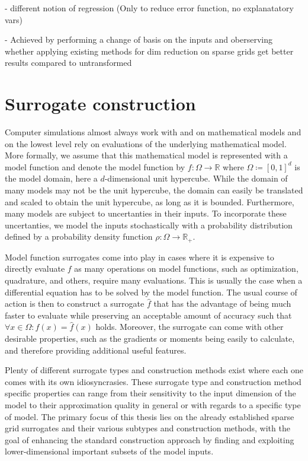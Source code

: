 \documentclass[
  a4paper,  %
  twoside,  %
  bibliography=totoc,
  headsepline,
  cleardoublepage=empty,
  parskip=half,
  draft=false
]{scrbook}
\begin{document}
- different notion of regression (Only to reduce error function, no explanatatory vars)

- Achieved by performing a change of basis on the inputs and oberserving whether applying existing methods for dim reduction on sparse grids get better results compared to untransformed

\chapter{Surrogate construction}
\label{chap:c2}

Computer simulations almost always work with and on mathematical models and on the lowest level rely on evaluations of the underlying mathematical model.
More formally, we assume that this mathematical model is represented with a model function and denote the model function by $f \colon \Omega \to \mathds{R}$ where $\Omega \coloneqq [0,1]^d$ is the model domain, here a $d$-dimensional unit hypercube.
While the domain of many models may not be the unit hypercube, the domain can easily be translated and scaled to obtain the unit hypercube, as long as it is bounded.
Furthermore, many models are subject to uncertanties in their inputs.
To incorporate these uncertanties, we model the inputs stochastically with a probability distribution defined by a probability density function $\rho \colon \Omega \to \mathds{R_+}$.

Model function surrogates come into play in cases where it is expensive to directly evaluate $f$ as many operations on model functions, such as optimization, quadrature, and others, require many evaluations.
This is usually the case when a differential equation has to be solved by the model function.
The usual course of action is then to construct a surrogate $\hat{f}$ that has the advantage of being much faster to evaluate while preserving an acceptable amount of accuracy such that $\forall x \in \Omega \colon f(x)=\hat{f}(x)$ holds.
Moreover, the surrogate can come with other desirable properties, such as the gradients or moments being easily to calculate, and therefore providing additional useful features.

Plenty of different surrogate types and construction methods exist where each one comes with its own idiosyncrasies.
These surrogate type and construction method specific properties can range from their sensitivity to the input dimension of the model to their approximation quality in general or with regards to a specific type of model. 
The primary focus of this thesis lies on the already established sparse grid surrogates \cite{} and their various subtypes and construction methods, with the goal of enhancing the standard construction approach by finding and exploiting lower-dimensional important subsets of the model inputs.
\end{document}
